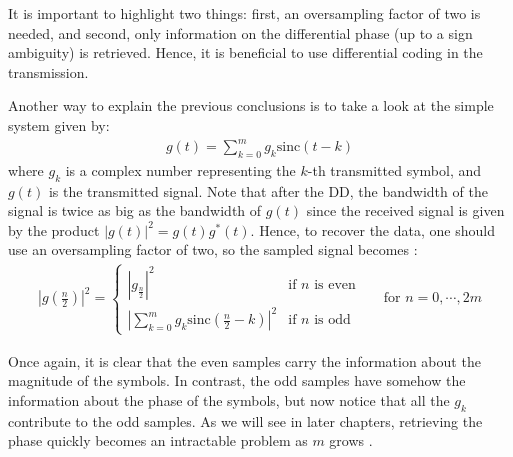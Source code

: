 It is important to highlight two things: first, an oversampling factor of two is needed, and second, only information on the differential phase (up to a sign ambiguity) is retrieved. Hence, it is beneficial to use differential coding in the transmission.

Another way to explain the previous conclusions is to take a look at the simple system given by:
\begin{align*}
	g(t)=\sum_{k=0}^m g_k\text{sinc}(t-k)
\end{align*}
where $g_k$ is a complex number representing the $k$-th transmitted symbol, and $g(t)$ is the transmitted signal. Note that after the DD, the bandwidth of the signal is twice as big as the bandwidth of $g(t)$ since the received signal is given by the product $|g(t)|^2=g(t)g^*(t)$. Hence, to recover the data, one should use an oversampling factor of two, so the sampled signal becomes \cite{Tasbihi_Tukey}:
\begin{align*}
	\left|g\left(\frac{n}{2}\right)\right|^2 = \left\{
\begin{array}{ll}
\left|g_{\frac{n}{2}}\right|^2  &  \text{if $n$ is even}  \\
\left|\sum\limits_{k=0}^m g_k\text{sinc}\left(\frac{n}{2}-k\right)\right|^2   & \text{if $n$ is odd}
\end{array}
\right. &&\text{for }n=0,\dotsb,2m
\end{align*}


Once again, it is clear that the even samples carry the information about the magnitude of the symbols. In contrast, the odd samples have somehow the information about the phase of the symbols, but now notice that all the $g_k$ contribute to the odd samples. As we will see in later chapters, retrieving the phase quickly becomes an intractable problem as $m$ grows \cite{Tasbihi_Tukey}. 

















